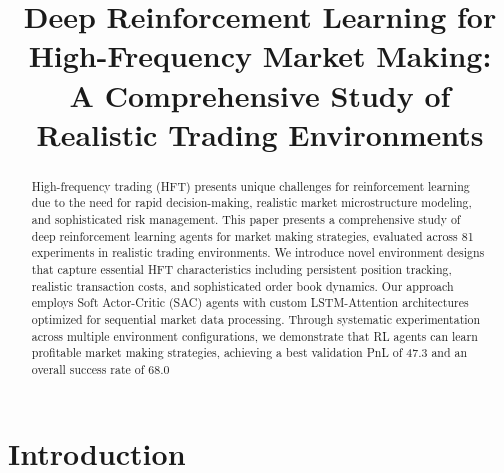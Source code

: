 \documentclass[conference]{IEEEtran}
\begin{document}
\title{Deep Reinforcement Learning for High-Frequency Market Making: \\
A Comprehensive Study of Realistic Trading Environments}

\author{
}

\maketitle



\begin{abstract}
High-frequency trading (HFT) presents unique challenges for reinforcement learning due to the need for rapid decision-making, realistic market microstructure modeling, and sophisticated risk management. This paper presents a comprehensive study of deep reinforcement learning agents for market making strategies, evaluated across 81 experiments in realistic trading environments. We introduce novel environment designs that capture essential HFT characteristics including persistent position tracking, realistic transaction costs, and sophisticated order book dynamics. Our approach employs Soft Actor-Critic (SAC) agents with custom LSTM-Attention architectures optimized for sequential market data processing. Through systematic experimentation across multiple environment configurations, we demonstrate that RL agents can learn profitable market making strategies, achieving a best validation PnL of 47.3 and an overall success rate of 68.0%
\end{abstract}



\section{Introduction}
\end{document}
